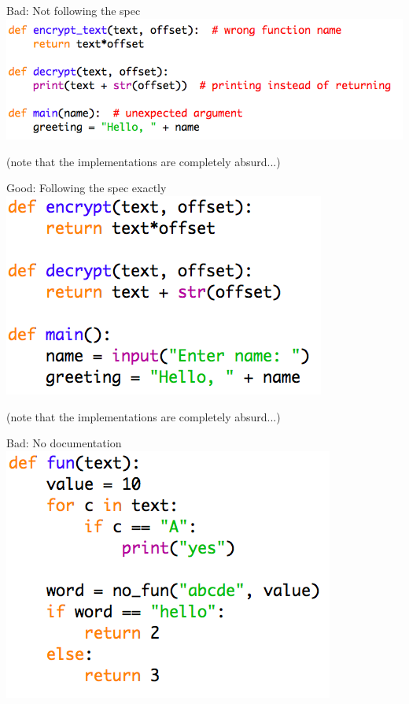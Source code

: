 \documentclass[week2]{csse1001}
\begin{document}
\begin{topic}{Bad: Not following the spec}
\includegraphics[height=0.4\textheight]{bad_python/incorrect}

(note that the implementations are completely absurd...)
\end{topic}

\begin{topic}{Good: Following the spec exactly}
\includegraphics[height=0.6\textheight]{bad_python/correct}

(note that the implementations are completely absurd...)
\end{topic}

\begin{topic}{Bad: No documentation}
\includegraphics[height=0.9\textheight]{bad_python/no_comments}
\end{topic}
\end{document}
